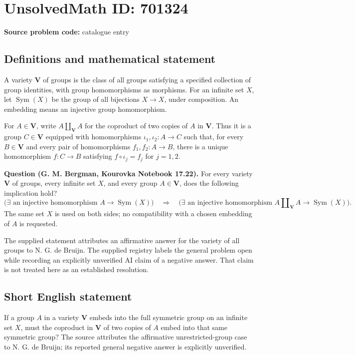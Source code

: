 \documentclass[11pt]{article}
\begin{document}
\section*{UnsolvedMath ID: 701324}
\textbf{Source problem code:} catalogue entry
\subsection{Definitions and mathematical statement}
A variety \(\mathbf V\) of groups is the class of all groups satisfying a specified collection of group identities, with group homomorphisms as morphisms. For an infinite set \(X\), let \(\operatorname{Sym}(X)\) be the group of all bijections \(X\to X\), under composition. An embedding means an injective group homomorphism.

For \(A\in\mathbf V\), write \(A\amalg_{\mathbf V}A\) for the coproduct of two copies of \(A\) in \(\mathbf V\). Thus it is a group \(C\in\mathbf V\) equipped with homomorphisms \(\iota_1,\iota_2:A\to C\) such that, for every \(B\in\mathbf V\) and every pair of homomorphisms \(f_1,f_2:A\to B\), there is a unique homomorphism \(f:C\to B\) satisfying \(f\circ\iota_j=f_j\) for \(j=1,2\).

\textbf{Question (G. M. Bergman, Kourovka Notebook 17.22).} For every variety \(\mathbf V\) of groups, every infinite set \(X\), and every group \(A\in\mathbf V\), does the following implication hold?
\[
\bigl(\exists\text{ an injective homomorphism }A\to\operatorname{Sym}(X)\bigr)
\quad\Longrightarrow\quad
\bigl(\exists\text{ an injective homomorphism }A\amalg_{\mathbf V}A\to\operatorname{Sym}(X)\bigr).
\]
The same set \(X\) is used on both sides; no compatibility with a chosen embedding of \(A\) is requested.

The supplied statement attributes an affirmative answer for the variety of all groups to N. G. de Bruijn. The supplied registry labels the general problem open while recording an explicitly unverified AI claim of a negative answer. That claim is not treated here as an established resolution.
\subsection{Short English statement}
If a group \(A\) in a variety \(\mathbf V\) embeds into the full symmetric group on an infinite set \(X\), must the coproduct in \(\mathbf V\) of two copies of \(A\) embed into that same symmetric group? The source attributes the affirmative unrestricted-group case to N. G. de Bruijn; its reported general negative answer is explicitly unverified.
\end{document}
